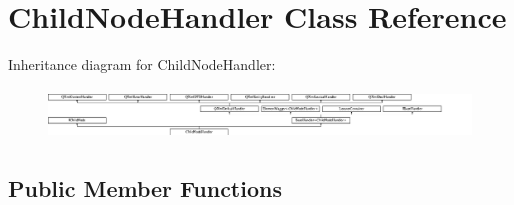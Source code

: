 \hypertarget{class_child_node_handler}{}\section{Child\+Node\+Handler Class Reference}
\label{class_child_node_handler}
Inheritance diagram for Child\+Node\+Handler\+:\begin{figure}[H]
\begin{center}
\leavevmode
\includegraphics[height=1.355932cm]{class_child_node_handler}
\end{center}
\end{figure}
\subsection*{Public Member Functions}
